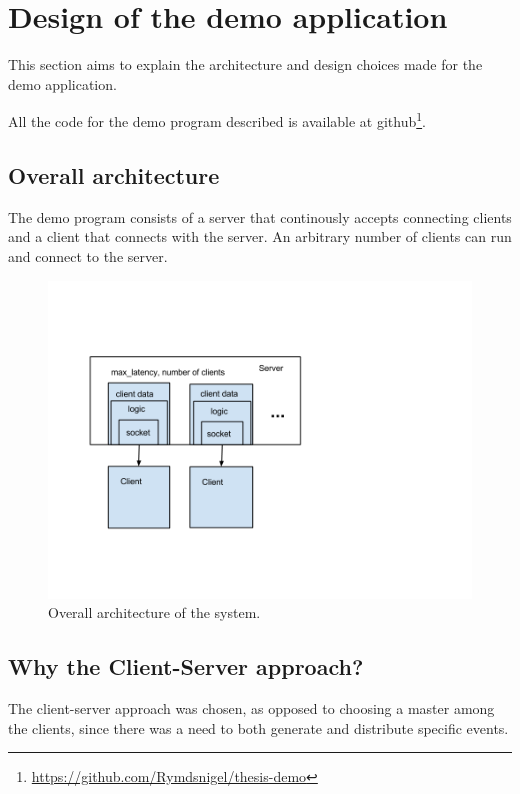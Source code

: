 \chapter{Design of the demo application}

This section aims to explain the architecture and design choices made for the demo application.

All the code for the demo program described is available at github\footnote{ \url{https://github.com/Rymdsnigel/thesis-demo}}.

\section{Overall architecture}
The demo program consists of a server that continously accepts connecting clients and a client that connects with the server. An arbitrary number of clients can run and connect to the server. 

\begin{figure}[h!]
\centering
\includegraphics[width=1.0\textwidth]{figures/arch.png}
\caption{Overall architecture of the system.}
\end{figure}



\section{Why the Client-Server approach?}
The client-server approach was chosen, as opposed to choosing a master among the clients, since there was a need to both generate and distribute specific events.

